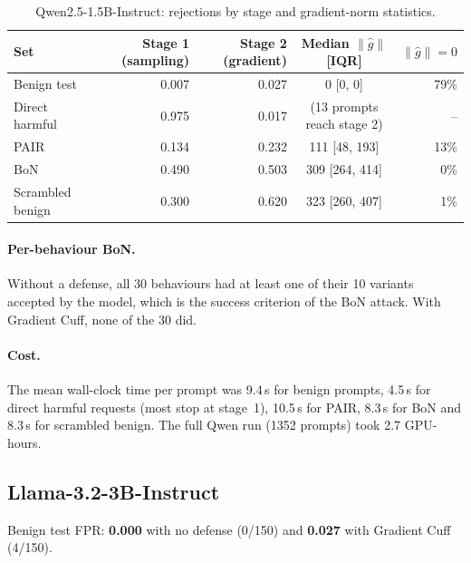 \documentclass[11pt,a4paper]{article}
\newcommand{\gnorm}{\lVert\hat{g}\rVert}
\begin{document}
\begin{table}[h]
\centering
\caption{Qwen2.5-1.5B-Instruct: rejections by stage and gradient-norm statistics.}
\label{tab:qwen-stage}
\small
\begin{tabular}{lrrcr}
\toprule
Set & Stage 1 (sampling) & Stage 2 (gradient) & Median $\gnorm$ [IQR] & $\gnorm = 0$ \\
\midrule
Benign test      & 0.007 & 0.027 & 0 [0, 0] & 79\% \\
Direct harmful   & 0.975 & 0.017 & (13 prompts reach stage 2) & -- \\
PAIR             & 0.134 & 0.232 & 111 [48, 193] & 13\% \\
BoN              & 0.490 & 0.503 & 309 [264, 414] & 0\% \\
Scrambled benign & 0.300 & 0.620 & 323 [260, 407] & 1\% \\
\bottomrule
\end{tabular}
\end{table}

\paragraph{Per-behaviour BoN.} Without a defense, all 30 behaviours had at least one of their 10 variants accepted by the model, which is the success criterion of the BoN attack. With Gradient Cuff, none of the 30 did.

\paragraph{Cost.} The mean wall-clock time per prompt was 9.4\,s for benign prompts, 4.5\,s for direct harmful requests (most stop at stage~1), 10.5\,s for PAIR, 8.3\,s for BoN and 8.3\,s for scrambled benign. The full Qwen run (1352 prompts) took 2.7 GPU-hours.

\subsection{Llama-3.2-3B-Instruct}

Benign test FPR: \textbf{0.000} with no defense (0/150) and \textbf{0.027} with Gradient Cuff (4/150).
\end{document}
